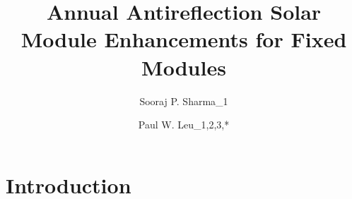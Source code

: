 \documentclass[preprint,12pt]{elsarticle}
\begin{document}


\title{Annual Antireflection Solar Module Enhancements for Fixed Modules}



\author{Sooraj P. Sharma_1}

\address{\textsuperscript{1}University of Pittsburgh, Department of Mechanical and Materials Science, Pittsburgh, PA 15261, USA}

\author{Paul W. Leu_{1,2,3,*}}
\address{\textsuperscript{1}University of Pittsburgh, Department of Industrial Engineering, Pittsburgh, PA 15261, USA}
\address{\textsuperscript{2}University of Pittsburgh, Department of Mechanical Engineering and Materials Science, Pittsburgh, PA 15261, USA}
\address{\textsuperscript{3}University of Pittsburgh, Department of Chemical Engineering, Pittsburgh, PA 15261, USA}
\address{\textsuperscript{*}Corresponding Author: pleu@pitt.edu}


\begin{abstract}




\end{abstract}




\section{Introduction}
\end{document}
